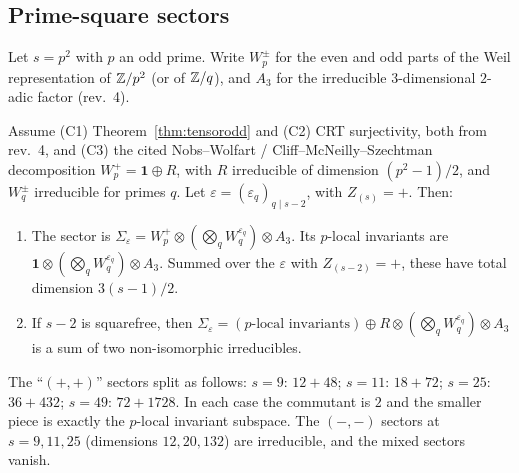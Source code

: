 \subsection{Prime-square sectors}\label{sec:rev6psq}
Let $s=p^2$ with $p$ an odd prime. Write $W_p^\pm$ for the even and odd parts of the Weil representation of $\mathbb{Z}/p^2$ (or of $\mathbb{Z}/q$), and $A_3$ for the irreducible $3$-dimensional $2$-adic factor (rev.~4).
\begin{theorem}\label{thm:psq6}
Assume (C1) Theorem~\ref{thm:tensorodd} and (C2) CRT surjectivity, both from rev.~4, and (C3) the cited Nobs--Wolfart / Cliff--McNeilly--Szechtman decomposition $W_p^+=\mathbf 1\oplus R$, with $R$ irreducible of dimension $(p^2-1)/2$, and $W_q^\pm$ irreducible for primes $q$. Let $\varepsilon=(\varepsilon_q)_{q\mid s-2}$, with $Z_{(s)}=+$. Then:
\begin{enumerate}[label=(\roman*)]
\item The sector is $\Sigma_\varepsilon=W_p^+\otimes(\bigotimes_qW_q^{\varepsilon_q})\otimes A_3$. Its $p$-local invariants are $\mathbf 1\otimes(\bigotimes_qW_q^{\varepsilon_q})\otimes A_3$. Summed over the $\varepsilon$ with $Z_{(s-2)}=+$, these have total dimension $3(s-1)/2$.
\item If $s-2$ is squarefree, then $\Sigma_\varepsilon=(\text{$p$-local invariants})\oplus R\otimes(\bigotimes_qW_q^{\varepsilon_q})\otimes A_3$ is a sum of two non-isomorphic irreducibles.
\end{enumerate}
\end{theorem}
\begin{proposition}\label{prop:splits6}
The ``$(+,+)$'' sectors split as follows: $s=9$: $12+48$; $s=11$: $18+72$; $s=25$: $36+432$; $s=49$: $72+1728$. In each case the commutant is $2$ and the smaller piece is exactly the $p$-local invariant subspace. The $(-,-)$ sectors at $s=9,11,25$ (dimensions $12,20,132$) are irreducible, and the mixed sectors vanish.
\end{proposition}
